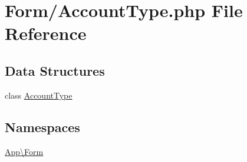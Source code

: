 \hypertarget{_account_type_8php}{}\section{Form/\+Account\+Type.php File Reference}
\label{_account_type_8php}
\subsection*{Data Structures}
\begin{DoxyCompactItemize}
\item 
class \mbox{\hyperlink{class_app_1_1_form_1_1_account_type}{Account\+Type}}
\end{DoxyCompactItemize}
\subsection*{Namespaces}
\begin{DoxyCompactItemize}
\item 
 \mbox{\hyperlink{namespace_app_1_1_form}{App\textbackslash{}\+Form}}
\end{DoxyCompactItemize}
